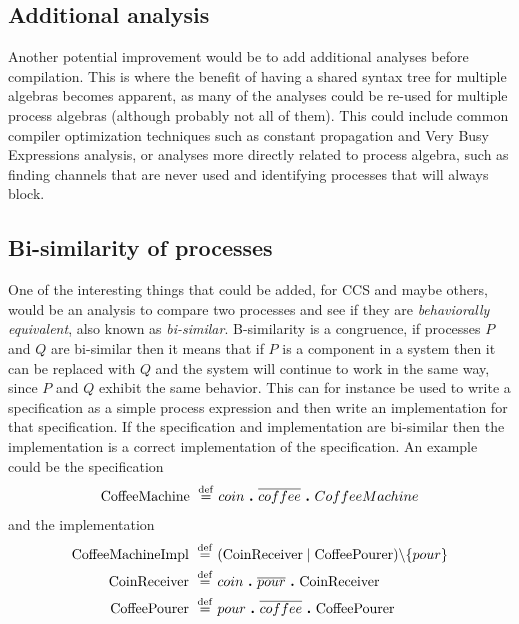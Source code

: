 	\subsection{Additional analysis}
	
	Another potential improvement would be to add additional analyses before 
	compilation. This is where the benefit of having a shared syntax tree for 
	multiple algebras becomes apparent, as many of the analyses could be re-used 
	for multiple process algebras (although probably not all of them). This 
	could include common compiler optimization techniques such as constant 
	propagation and Very Busy Expressions analysis, or analyses more directly 
	related to process algebra, such as finding channels that are never used
	and identifying processes that will always block.
	
	\subsection{Bi-similarity of processes}
	One of the interesting things that could be added, for CCS and maybe others, 
	would be an analysis to compare two processes and see if they are 
	\textit{behaviorally equivalent}, also known as \textit{bi-similar}. 
	B-similarity is a congruence, if processes $P$ and $Q$ are bi-similar then 
	it means that if $P$ is a component in a system then it can be replaced with 
	$Q$ and the system will continue to work in the same way, since $P$ and $Q$ 
	exhibit the same behavior. This can for instance be used to write a 
	specification as a simple process expression and then write an 
	implementation for that specification. If the specification and 
	implementation are bi-similar then the implementation is a correct 
	implementation of the specification. An example could be the specification
  \begin{align*}
			\mathrm{CoffeeMachine} \ \stackrel{\mathrm{def}}{=}\  & coin  \ \textbf{.}\  \overline{coffee} \ \textbf{.}\  CoffeeMachine \\
	\end{align*} and the implementation
  \begin{align*}
			\mathrm{CoffeeMachineImpl} \ \stackrel{\mathrm{def}}{=}\  & ( \mathrm{CoinReceiver} \mid \mathrm{CoffeePourer} ) \backslash \{pour\} \\
			\mathrm{CoinReceiver} \ \stackrel{\mathrm{def}}{=}\  & coin \ \textbf{.}\  \overline{pour} \ \textbf{.}\  \mathrm{CoinReceiver} \\
			\mathrm{CoffeePourer} \ \stackrel{\mathrm{def}}{=}\  & pour \ \textbf{.}\  \overline{coffee} \ \textbf{.}\  \mathrm{CoffeePourer}
	\end{align*}	


